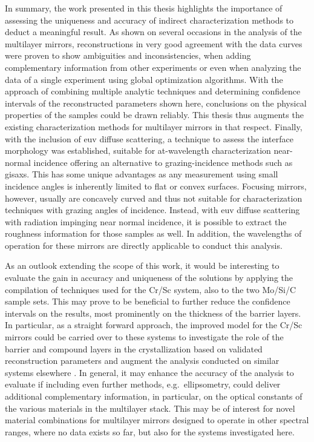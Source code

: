 In summary, the work presented in this thesis highlights the importance of assessing the uniqueness and accuracy of indirect characterization methods to deduct a meaningful result. As shown on several occasions in the analysis of the multilayer mirrors, reconstructions in very good agreement with the data curves were proven to show ambiguities and inconsistencies, when adding complementary information from other experiments or even when analyzing the data of a single experiment using global optimization algorithms. With the approach of combining multiple analytic techniques and determining confidence intervals of the reconstructed parameters shown here, conclusions on the physical properties of the samples could be drawn reliably. This thesis thus augments the existing characterization methods for multilayer mirrors in that respect. Finally, with the inclusion of \gls{euv} diffuse scattering, a technique to assess the interface morphology was established, suitable for at-wavelength characterization near-normal incidence offering an alternative to grazing-incidence methods such as \gls{gisaxs}. This has some unique advantages as any measurement using small incidence angles is inherently limited to flat or convex surfaces. Focusing mirrors, however, usually are concavely curved and thus not suitable for characterization techniques with grazing angles of incidence. Instead, with \gls{euv} diffuse scattering with radiation impinging near normal incidence, it is possible to extract the roughness information for those samples as well. In addition, the wavelengths of operation for these mirrors are directly applicable to conduct this analysis.

As an outlook extending the scope of this work, it would be interesting to evaluate the gain in accuracy and uniqueness of the solutions by applying the compilation of techniques used for the Cr/Sc system, also to the two Mo/Si/C sample sets. This may prove to be beneficial to further reduce the confidence intervals on the results, most prominently on the thickness of the barrier layers. In particular, as a straight forward approach, the improved model for the Cr/Sc mirrors could be carried over to these systems to investigate the role of the barrier and compound layers in the crystallization based on validated reconstruction parameters and augment the analysis conducted on similar systems elsewhere \cite{bajt_investigation_2001}. In general, it may enhance the accuracy of the analysis to evaluate if including even further methods, e.g.~ellipsometry, could deliver additional complementary information, in particular, on the optical constants of the various materials in the multilayer stack. This may be of interest for novel material combinations for multilayer mirrors designed to operate in other spectral ranges, where no data exists so far, but also for the systems investigated here.